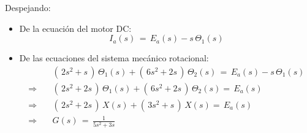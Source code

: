 \documentclass[ 10pt, xcolor = dvipsnames]{beamer}
\begin{document}
\begin{frame}[allowframebreaks]
Despejando: 
\begin{itemize}
\item De la ecuaci\'on del motor DC: 
\[
I_a(s) \, = \, E_a(s) - s \, \Theta_1(s)
\]
\item De las ecuaciones del sistema mec\'anico rotacional: 
\begin{align*}
& ( \, 2 s^2 + s \, ) \, \Theta_1(s) + 
( \, 6 s^2 + 2 s \, ) \, \Theta_2(s) \, = \,
E_a(s) - s \, \Theta_1(s) \\[1ex]
\Longrightarrow \quad
& ( \, 2 s^2 + 2 s \, ) \, \Theta_1(s) + 
( \, 6 s^2 + 2 s \, ) \, \Theta_2(s) = \, E_a(s) \\[1ex]
\Longrightarrow \quad
& ( \, 2 s^2 + 2 s \, ) \, X(s) + 
( \, 3 s^2 + s \, ) \, X(s) = \, E_a(s) \\[1ex]
\Longrightarrow \quad
& G(s) \, = \, \frac{1}{ 5 s^2 + 3s }
\end{align*}
\end{itemize}

\end{frame}
\end{document}
